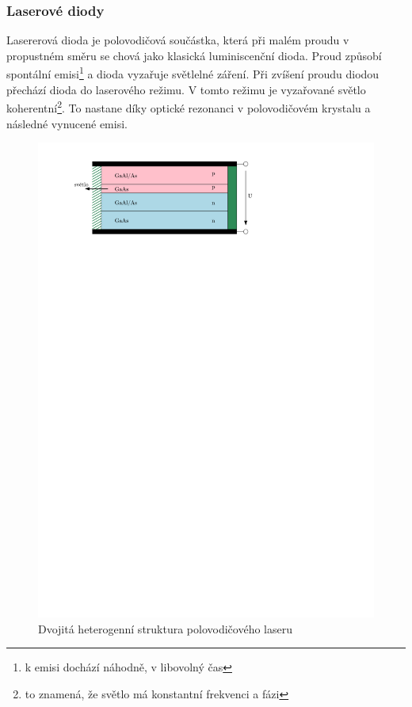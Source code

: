 \subsubsection{Laserové diody}
Lasererová dioda je polovodičová součástka, která při malém proudu v propustném směru se chová jako klasická luminiscenční dioda. Proud způsobí spontální emisi\footnote{k emisi dochází náhodně, v libovolný čas} a dioda vyzařuje světlelné záření. Při zvíšení proudu diodou přechází dioda do laserového režimu. V tomto režimu je vyzařované světlo koherentní\footnote{to znamená, že světlo má konstantní frekvenci a fázi}. To nastane díky optické rezonanci v polovodičovém krystalu a následné vynucené emisi.

\begin{figure}[!h]
    \begin{center}
        \includegraphics[scale=1]{img/laser}
    \end{center}
    \caption{Dvojitá heterogenní struktura polovodičového laseru}
\end{figure}

